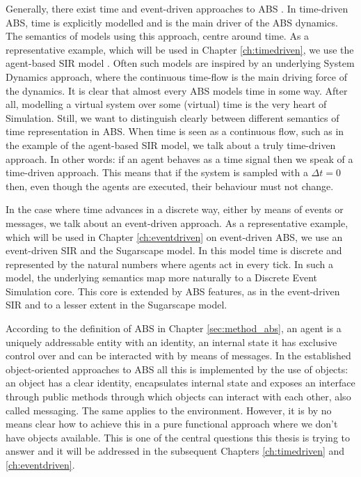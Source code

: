 Generally, there exist time and event-driven approaches to ABS \cite{meyer_event-driven_2014}. In time-driven ABS, time is explicitly modelled and is the main driver of the ABS dynamics. The semantics of models using this approach, centre around time. As a representative example, which will be used in Chapter \ref{ch:timedriven}, we use the agent-based SIR model \cite{macal_agent-based_2010}. Often such models are inspired by an underlying System Dynamics approach, where the continuous time-flow is the main driving force of the dynamics. It is clear that almost every ABS models time in some way. After all, modelling a virtual system over some (virtual) time is the very heart of Simulation. Still, we want to distinguish clearly between different semantics of time representation in ABS. When time is seen as a continuous flow, such as in the example of the agent-based SIR model, we talk about a truly time-driven approach. In other words: if an agent behaves as a time signal then we speak of a time-driven approach. This means that if the system is sampled with a $\Delta t = 0$ then, even though the agents are executed, their behaviour must not change.

In the case where time advances in a discrete way, either by means of events or messages, we talk about an event-driven approach. As a representative example, which will be used in Chapter \ref{ch:eventdriven} on event-driven ABS, we use an event-driven SIR and the Sugarscape model. In this model time is discrete and represented by the natural numbers where agents act in every tick. In such a model, the underlying semantics map more naturally to a Discrete Event Simulation core. This core is extended by ABS features, as in the event-driven SIR and to a lesser extent in the Sugarscape model.

According to the definition of ABS in  Chapter \ref{sec:method_abs}, an agent is a uniquely addressable entity with an identity, an internal state it has exclusive control over and can be interacted with by means of messages. In the established object-oriented approaches to ABS all this is implemented by the use of objects: an object has a clear identity, encapsulates internal state and exposes an interface through public methods through which objects can interact with each other, also called messaging. The same applies to the environment. However, it is by no means clear how to achieve this in a pure functional approach where we don't have objects available. This is one of the central questions this thesis is trying to answer and it will be addressed in the subsequent Chapters \ref{ch:timedriven} and \ref{ch:eventdriven}.

